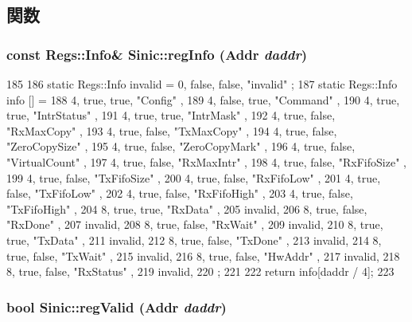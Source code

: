 \subsection{関数}
\hypertarget{namespaceSinic_aed2d64d4f995743e60f0fee5cca4e739}{
\subsubsection[{regInfo}]{\setlength{\rightskip}{0pt plus 5cm}const {\bf Regs::Info}\& Sinic::regInfo ({\bf Addr} {\em daddr})}}
\label{namespaceSinic_aed2d64d4f995743e60f0fee5cca4e739}



\begin{DoxyCode}
185 {
186     static Regs::Info invalid = { 0, false, false, "invalid" };
187     static Regs::Info info [] = {
188         { 4, true,  true,  "Config"       },
189         { 4, false, true,  "Command"      },
190         { 4, true,  true,  "IntrStatus"   },
191         { 4, true,  true,  "IntrMask"     },
192         { 4, true,  false, "RxMaxCopy"    },
193         { 4, true,  false, "TxMaxCopy"    },
194         { 4, true,  false, "ZeroCopySize" },
195         { 4, true,  false, "ZeroCopyMark" },
196         { 4, true,  false, "VirtualCount" },
197         { 4, true,  false, "RxMaxIntr"    },
198         { 4, true,  false, "RxFifoSize"   },
199         { 4, true,  false, "TxFifoSize"   },
200         { 4, true,  false, "RxFifoLow"    },
201         { 4, true,  false, "TxFifoLow"    },
202         { 4, true,  false, "RxFifoHigh"   },
203         { 4, true,  false, "TxFifoHigh"   },
204         { 8, true,  true,  "RxData"       },
205         invalid,
206         { 8, true,  false, "RxDone"       },
207         invalid,
208         { 8, true,  false, "RxWait"       },
209         invalid,
210         { 8, true,  true,  "TxData"       },
211         invalid,
212         { 8, true,  false, "TxDone"       },
213         invalid,
214         { 8, true,  false, "TxWait"       },
215         invalid,
216         { 8, true,  false, "HwAddr"       },
217         invalid,
218         { 8, true,  false, "RxStatus"     },
219         invalid,
220     };
221 
222     return info[daddr / 4];
223 }
\end{DoxyCode}
\hypertarget{namespaceSinic_af92abee16113e5012fa829e4935d917a}{
\subsubsection[{regValid}]{\setlength{\rightskip}{0pt plus 5cm}bool Sinic::regValid ({\bf Addr} {\em daddr})}}
\label{namespaceSinic_af92abee16113e5012fa829e4935d917a}



